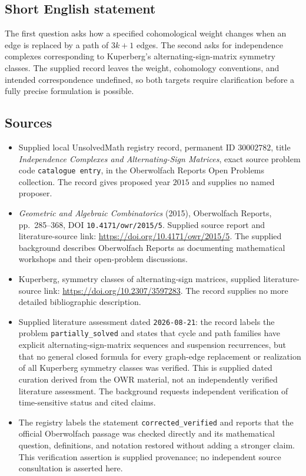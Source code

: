 \documentclass[11pt]{article}
\begin{document}
\subsection{Short English statement}
The first question asks how a specified cohomological weight changes when an edge is replaced by a path of \(3k+1\) edges. The second asks for independence complexes corresponding to Kuperberg's alternating-sign-matrix symmetry classes. The supplied record leaves the weight, cohomology conventions, and intended correspondence undefined, so both targets require clarification before a fully precise formulation is possible.
\subsection{Sources}
\begin{itemize}
\item Supplied local UnsolvedMath registry record, permanent ID \(30002782\), title \emph{Independence Complexes and Alternating-Sign Matrices}, exact source problem code \texttt{catalogue entry}, in the Oberwolfach Reports Open Problems collection. The record gives proposed year \(2015\) and supplies no named proposer.
\item \emph{Geometric and Algebraic Combinatorics} (2015), Oberwolfach Reports, pp.\ 285--368, DOI \texttt{10.4171/owr/2015/5}. Supplied source report and literature-source link: \url{https://doi.org/10.4171/owr/2015/5}. The supplied background describes Oberwolfach Reports as documenting mathematical workshops and their open-problem discussions.
\item Kuperberg, symmetry classes of alternating-sign matrices, supplied literature-source link: \url{https://doi.org/10.2307/3597283}. The record supplies no more detailed bibliographic description.
\item Supplied literature assessment dated \texttt{2026-08-21}: the record labels the problem \texttt{partially\_solved} and states that cycle and path families have explicit alternating-sign-matrix sequences and suspension recurrences, but that no general closed formula for every graph-edge replacement or realization of all Kuperberg symmetry classes was verified. This is supplied dated curation derived from the OWR material, not an independently verified literature assessment. The background requests independent verification of time-sensitive status and cited claims.
\item The registry labels the statement \texttt{corrected\_verified} and reports that the official Oberwolfach passage was checked directly and its mathematical question, definitions, and notation restored without adding a stronger claim. This verification assertion is supplied provenance; no independent source consultation is asserted here.
\end{itemize}
\end{document}
